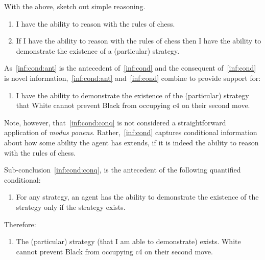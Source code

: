 \documentclass[10pt]{article}
\begin{document}
\begin{note}
  With the above, sketch out simple reasoning.
  \begin{enumerate}[label=(S\arabic*), ref=(S\arabic*)]
  \item\label{inf:cond:ant} I have the ability to reason with the rules of chess.
  \item\label{inf:cond} If I have the ability to reason with the rules of chess then I have the ability to demonstrate the existence of a (particular) strategy.
  \end{enumerate}

  As~\ref{inf:cond:ant} is the antecedent of~\ref{inf:cond} and the consequent of~\ref{inf:cond} is novel information,~\ref{inf:cond:ant} and~\ref{inf:cond} combine to provide support for:

  \begin{enumerate}[resume, label=(S\arabic*), ref=(S\arabic*)]
  \item\label{inf:cond:conq} I have the ability to demonstrate the existence of the (particular) strategy that White cannot prevent Black from occupying c4 on their second move.
  \end{enumerate}

  Note, however, that~\ref{inf:cond:conq} is not considered a straightforward application of \emph{modus ponens}.
  Rather,~\ref{inf:cond} captures conditional information about how some ability the agent has extends, if it is indeed the ability to reason with the rules of chess.

  Sub-conclusion~\ref{inf:cond:conq}, is the antecedent of the following quantified conditional:

  \begin{enumerate}[resume, label=(S\arabic*), ref=(S\arabic*)]
  \item\label{inf:gae} For any strategy, an agent has the ability to demonstrate the existence of the strategy only if the strategy exists.
  \end{enumerate}

  Therefore:

  \begin{enumerate}[resume, label=(S\arabic*), ref=(S\arabic*)]
  \item\label{inf:sse} The (particular) strategy (that I am able to demonstrate) exists.\newline
    White cannot prevent Black from occupying c4 on their second move.
  \end{enumerate}
\end{note}
\end{document}
